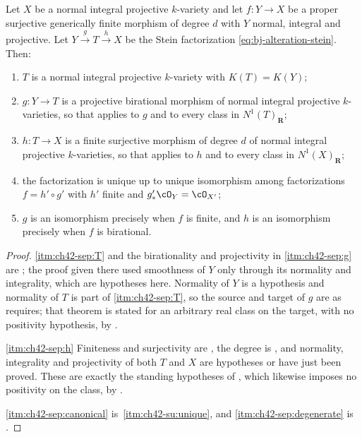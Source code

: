 \begin{proposition}
\label{prop:ch42-separation}
Let $X$ be a normal integral projective $k$-variety and let
$f:Y\to X$ be a proper surjective generically finite morphism of degree
$d$ with $Y$ normal, integral and projective.  Let
$Y\xrightarrow{g}T\xrightarrow{h}X$ be the Stein factorization
\eqref{eq:bj-alteration-stein}.  Then:
\begin{enumerate}
\item\label{itm:ch42-sep:T} $T$ is a normal integral projective
      $k$-variety with $K(T)=K(Y)$;
\item\label{itm:ch42-sep:g} $g:Y\to T$ is a projective birational morphism
      of normal integral projective $k$-varieties, so that
       applies to $g$ and to every
      class in $N^1(T)_{\mathbf R}$;
\item\label{itm:ch42-sep:h} $h:T\to X$ is a finite surjective morphism of
      degree $d$ of normal integral projective $k$-varieties, so that
       applies to $h$ and to every
      class in $N^1(X)_{\mathbf R}$;
\item\label{itm:ch42-sep:canonical} the factorization is unique up to unique
      isomorphism among factorizations $f=h'\circ g'$ with $h'$ finite
      and $g'_*\cO_Y=\cO_{X'}$;
\item\label{itm:ch42-sep:degenerate} $g$ is an isomorphism precisely when
      $f$ is finite, and $h$ is an isomorphism precisely when $f$ is
      birational.
\end{enumerate}
\end{proposition}

\begin{proof}
\cref{itm:ch42-sep:T} and the birationality and projectivity in
\cref{itm:ch42-sep:g} are ; the proof given
there used smoothness of $Y$ only through its normality and integrality,
which are hypotheses here.  Normality of $Y$ is a hypothesis and normality
of $T$ is part of \cref{itm:ch42-sep:T}, so the source and target of $g$
are as  requires; that theorem is stated
for an arbitrary real class on the target, with no positivity hypothesis, by
.

\cref{itm:ch42-sep:h}  Finiteness and surjectivity are
, the degree is
, and normality, integrality and projectivity of
both $T$ and $X$ are hypotheses or have just been proved.  These are
exactly the standing hypotheses of ,
which likewise imposes no positivity on the class, by
.

\cref{itm:ch42-sep:canonical} is
\,\cref{itm:ch42-su:unique}, and
\cref{itm:ch42-sep:degenerate} is .
\end{proof}

